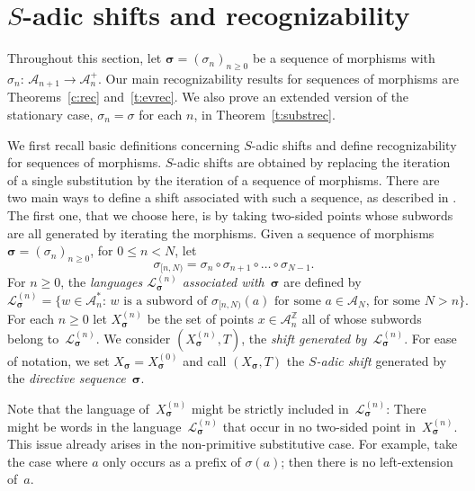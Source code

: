\documentclass{amsart}
\theoremstyle{definition}
\theoremstyle{remark}
\numberwithin{equation}{section}
\begin{document}
\section{$S$-adic shifts and recognizability} \label{main_S_adic}

Throughout this section, let $\boldsymbol{\sigma} = (\sigma_n)_{n\ge0}$ be a sequence of morphisms with $\sigma_n:\, \mathcal{A}_{n+1}\to \mathcal{A}_n^+$. Our main recognizability results for sequences of morphisms are Theorems~\ref{c:rec} and~\ref{t:evrec}.
We also prove an extended version of the stationary case, $\sigma_n=\sigma $ for each $n$,  in Theorem~\ref{t:substrec}.


We first recall basic definitions concerning $S$-adic shifts and define recognizability for sequences of morphisms.
$S$-adic shifts are obtained by replacing the iteration of a single substitution by the iteration of a sequence of morphisms.
There are two main ways to define a shift associated with such a sequence, as described in \cite{AubSab}. 
The first one, that we choose here, is by taking two-sided points whose subwords are all generated by iterating the morphisms.  Given a sequence of morphisms $\boldsymbol{\sigma} = (\sigma_n)_{n\ge0}$, for $0\leq n<N$, let 
\[
\sigma_{[n,N)} = \sigma_n \circ \sigma_{n+1} \circ \dots \circ \sigma_{N-1}.
\]
For $n\geq 0$, the \emph{languages $\mathcal{L}_{\boldsymbol{\sigma}}^{(n)}$ associated with~$\boldsymbol{\sigma}$} are defined by 
\[
\mathcal{L}_{\boldsymbol{\sigma}}^{(n)} = \big\{w \in \mathcal{A}_n^*:\, \mbox{$w$ is a subword of $\sigma_{[n,N)}(a)$ for some $a \in\mathcal{A}_N$, for some $N>n$}\big\}.
\]
For each $n\geq 0$ let $X_{\boldsymbol{\sigma}}^{(n)}$ be the set of points $x \in \mathcal{A}_n^\mathbb{Z}$ all of whose subwords belong to~$  \mathcal{L}_{\boldsymbol{\sigma}}^{(n)}$. We consider
$(X_{\boldsymbol{\sigma}}^{(n)},T)$, the {\em shift generated by~$\mathcal{L}_{\boldsymbol{\sigma}}^{(n)}$}. 
For ease of notation, we set $X_{\boldsymbol{\sigma}} = X_{\boldsymbol{\sigma}}^{(0)}$ and call $(X_{\boldsymbol{\sigma}},T)$ the \emph{$S$-adic shift} generated by the \emph{directive sequence}~$\boldsymbol{\sigma}$.

Note that the language of~$X_{\boldsymbol{\sigma}}^{(n)}$ might be strictly included in~$\mathcal{L}_{\boldsymbol{\sigma}}^{(n)}$: There might be words in the language~$\mathcal{L}_{\boldsymbol{\sigma}}^{(n)}$ that occur in no two-sided point in~$X_{\boldsymbol{\sigma}}^{(n)}$. 
This issue already arises in the non-primitive substitutive case. For example, take the case where $a$ only occurs as a prefix of  $\sigma(a)$; then there is no left-extension of~$a$. 
\end{document}
